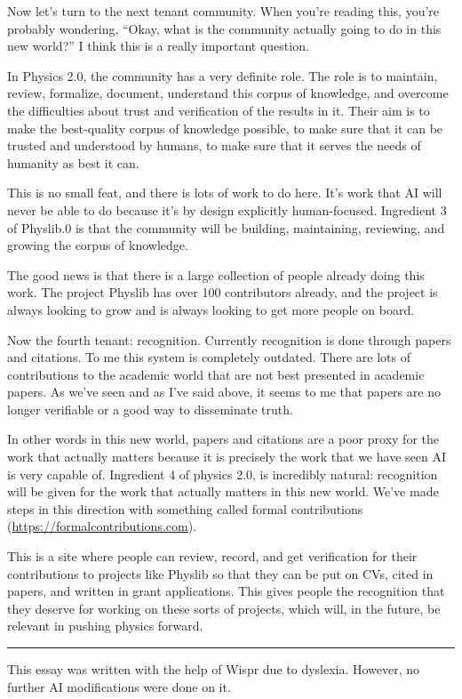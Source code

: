 \documentclass[11pt,a4paper]{article}
\begin{document}
Now let's turn to the next tenant community. When you're reading this, you're probably wondering, ``Okay, what is the community actually going to do in this new world?'' I think this is a really important question.

In Physics 2.0, the community has a very definite role. The role is to maintain, review, formalize, document, understand this corpus of knowledge, and overcome the difficulties about trust and verification of the results in it. Their aim is to make the best-quality corpus of knowledge possible, to make sure that it can be trusted and understood by humans, to make sure that it serves the needs of humanity as best it can.

This is no small feat, and there is lots of work to do here. It's work that AI will never be able to do because it's by design explicitly human-focused. Ingredient 3 of Physlib.0 is that the community will be building, maintaining, reviewing, and growing the corpus of knowledge.

The good news is that there is a large collection of people already doing this work. The project Physlib has over 100 contributors already, and the project is always looking to grow and is always looking to get more people on board.

Now the fourth tenant: recognition. Currently recognition is done through papers and citations. To me this system is completely outdated. There are lots of contributions to the academic world that are not best presented in academic papers. As we've seen and as I've said above, it seems to me that papers are no longer verifiable or a good way to disseminate truth.

In other words in this new world, papers and citations are a poor proxy for the work that actually matters because it is precisely the work that we have seen AI is very capable of. Ingredient 4 of physics 2.0, is incredibly natural: recognition will be given for the work that actually matters in this new world. We've made steps in this direction with something called formal contributions (\url{https://formalcontributions.com}).

This is a site where people can review, record, and get verification for their contributions to projects like Physlib so that they can be put on CVs, cited in papers, and written in grant applications. This gives people the recognition that they deserve for working on these sorts of projects, which will, in the future, be relevant in pushing physics forward.

\begin{center}\rule{0.3\textwidth}{0.4pt}\end{center}

{\small\noindent This essay was written with the help of Wispr due to dyslexia. However, no further AI modifications were done on it.}
\end{document}
